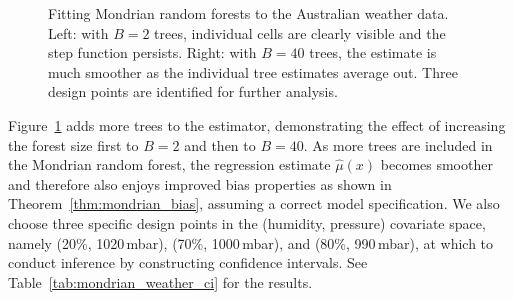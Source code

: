 \begin{figure}[t]
\begin{subfigure}{0.49\textwidth}
  \end{subfigure}
  \caption[Fitting Mondrian random forests to the Australian weather data]{
    Fitting Mondrian random forests to the Australian weather data.
    Left: with $B=2$ trees, individual cells are clearly visible and the step
    function persists. Right: with $B=40$ trees, the estimate is much smoother
    as the individual tree estimates average out.
  Three design points are identified for further analysis.}
  \label{fig:mondrian_weather_forest}
\end{figure}

Figure~\ref{fig:mondrian_weather_forest} adds more trees to the estimator,
demonstrating the effect of increasing the forest size first to $B=2$
and then to $B=40$.
As more trees are included in the Mondrian random forest,
the regression estimate $\hat \mu(x)$ becomes smoother and therefore also
enjoys improved bias properties as shown in
Theorem~\ref{thm:mondrian_bias}, assuming a correct model specification.
We also choose three specific design points in the
(humidity, pressure) covariate space,
namely (20\%, 1020\,mbar), (70\%, 1000\,mbar), and (80\%, 990\,mbar),
at which to conduct inference
by constructing confidence intervals. See Table~\ref{tab:mondrian_weather_ci}
for the results.


